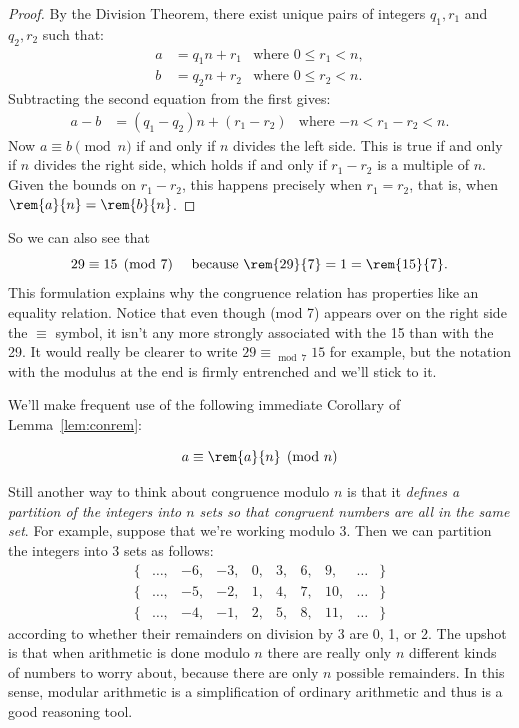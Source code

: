 \begin{proof}
By the Division Theorem, there exist unique pairs of integers $q_1, r_1$
and $q_2, r_2$ such that:
%
\begin{align*}
a & = q_1 n + r_1 & \text{where $0 \leq r_1 < n$}, \\
b & = q_2 n + r_2 & \text{where $0 \leq r_2 < n$}.
\end{align*}
%
Subtracting the second equation from the first gives:
%
\begin{align*}
a - b & = (q_1 - q_2) n + (r_1 - r_2)
  & \text{where $-n < r_1 - r_2 < n$}.
\end{align*}
%
Now $a \equiv b \pmod{n}$ if and only if $n$ divides the left side.
This is true if and only if $n$ divides the right side, which holds if
and only if $r_1 - r_2$ is a multiple of $n$.  Given the bounds on
$r_1 - r_2$, this happens precisely when $r_1 = r_2$, that is, when
$\rem{a}{n} = \rem{b}{n}$.
\end{proof}

So we can also see that
\[
29 \equiv 15 \pmod{7} \quad\text{ because } \rem{29}{7} = 1 = \rem{15}{7}.
\]
This formulation explains why the congruence relation has properties
like an equality relation.  Notice that even though (mod 7) appears
over on the right side the $\equiv$ symbol, it isn't any more strongly
associated with the 15 than with the 29.  It would really be clearer
to write $29 \equiv_{\mod 7} 15$ for example, but the notation with
the modulus at the end is firmly entrenched and we'll stick to it.

We'll make frequent use of the following immediate Corollary of
Lemma~\ref{lem:conrem}:
\begin{corollary}\label{aran}
\[
a \equiv \rem{a}{n} \pmod{n}
\]
\end{corollary}

Still another way to think about congruence modulo $n$ is that it
\emph{defines a partition of the integers into $n$ sets so that congruent
numbers are all in the same set}.  For example, suppose that we're working
modulo 3.  Then we can partition the integers into 3 sets as follows:
%
\[
\begin{array}{cccccccccc}
\{ & \dots, & -6, & -3, & 0, & 3, & 6, & 9, & \dots & \} \\
\{ & \dots, & -5, & -2, & 1, & 4, & 7, & 10, & \dots & \} \\
\{ & \dots, & -4, & -1, & 2, & 5, & 8, & 11, & \dots & \}
\end{array}
\]
according to whether their remainders on division by 3 are 0, 1, or 2.
The upshot is that when arithmetic is done modulo $n$ there are really
only $n$ different kinds of numbers to worry about, because there are only
$n$ possible remainders.  In this sense, modular arithmetic is a
simplification of ordinary arithmetic and thus is a good reasoning tool.

